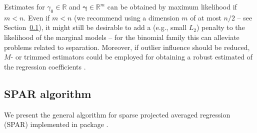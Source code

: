 \documentclass[
  article,
  nojss]{jss}
\begin{document}
Estimates for \(\gamma_0\in\mathbb{R}\) and
\(\boldsymbol{\gamma}\in\mathbb{R}^m\) can be obtained by maximum
likelihood if \(m < n\). Even if \(m < n\) (we recommend using a
dimension \(m\) of at most \(n/2\) -- see Section~\ref{sec-algo}), it
might still be desirable to add a (e.g., small \(L_2\)) penalty to the
likelihood of the marginal models -- for the binomial family this can
alleviate problems related to separation. Moreover, if outlier influence
should be reduced, \(M\)- or trimmed estimators could be employed for
obtaining a robust estimated of the regression coefficients \citep[see
e.g.,][]{cantoni2001robust}.

\subsection{SPAR algorithm}\label{sec-algo}

We present the general algorithm for sparse projected averaged
regression (SPAR) implemented in package .
\end{document}
